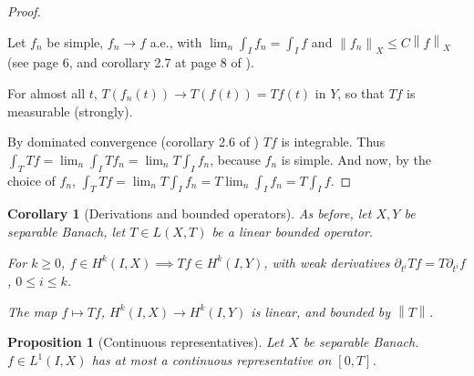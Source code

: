 \documentclass[english,a4paper,9pt,oneside]{scrbook}	%
\theoremstyle{break}
\newtheorem{cor}[equation]{Corollary}
\newtheorem{prop}[equation]{Proposition}
\newenvironment{mproof}[1][\proofname]{%
  \begin{proof}[#1]$ $\par\nobreak\ignorespaces
}{%
  \end{proof}
}
\renewcommand*{\proofname}{Proof}
\theoremstyle{remark}
\newcommand{\mR}{\mathbb{R}}
\newcommand{\norm}[1]{\left\lVert#1\right\rVert}
\begin{document}
\begin{appendices}
\begin{mproof}
Let $f_n$ be simple, $f_n\rightarrow f $ a.e., with $\lim_n \int_I f_n = \int_I f$ and $\norm{f_n}_X \leq C \norm{f}_X$ (see page 6, and corollary 2.7 at page 8 of \cite{kreuter}).

For almost all $t$, $T(f_n(t)) \rightarrow T(f(t))=Tf(t)$ in $Y$, so that $Tf$ is measurable (strongly).

By dominated convergence (corollary 2.6 of \cite{kreuter}) $Tf$ is integrable. Thus $\int_T Tf = \lim_n \int_I  Tf_n = \lim_n T\int_I  f_n$, because $f_n$ is simple. And now, by the choice of $f_n$, $\int_T Tf = \lim_n T\int_I  f_n = T \lim_n \int_I  f_n = T \int_I f$.
\end{mproof}

\begin{cor}	[Derivations and bounded operators]
\label{lemma:bochner_Hk_map}
As before, let $X,Y$ be separable Banach, let $T \in L(X,T)$ be a linear bounded operator.

For $k\geq 0$, $f \in H^k(I,X)\implies Tf \in H^k(I,Y)$, with weak derivatives $\partial_{t^i}Tf = T\partial_{t^i}f$, $0\leq i \leq k$.

The map $f \mapsto Tf$, $H^k(I,X)\rightarrow H^k(I,Y)$ is linear, and bounded by $\norm{T}$.
\end{cor}
%
%
%
%

\begin{prop}[Continuous representatives]
\label{prop:cts_repr}
Let $X$ be separable Banach. $f \in L^1(I,X)$ has at most a continuous representative on $[0,T]$.
\end{prop}


\end{appendices}
\end{document}
